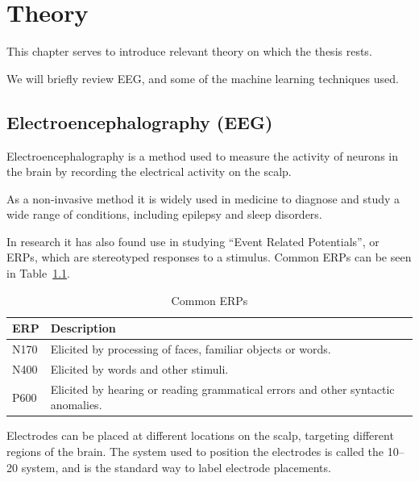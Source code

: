 \chapter{Theory}

This chapter serves to introduce relevant theory on which the thesis rests. 

We will briefly review EEG, and some of the machine learning techniques used.

\section{Electroencephalography (EEG)}\label{eeg-theory}

    Electroencephalography is a method used to measure the activity of neurons in the brain by recording the electrical activity on the scalp.

    As a non-invasive method it is widely used in medicine to diagnose and study a wide range of conditions, including epilepsy and sleep disorders.

    In research it has also found use in studying ``Event Related Potentials'', or ERPs, which are stereotyped responses to a stimulus. Common ERPs can be seen in Table~\ref{table:erps}.

    \begin{table}
        \begin{tabular}{ll}
            \toprule
            ERP & Description
            \\
            \midrule
            N170 & Elicited by processing of faces, familiar objects or words.
            \\
            N400 & Elicited by words and other stimuli.
            \\
            P600 & Elicited by hearing or reading grammatical errors and other syntactic anomalies.
            \\
            \bottomrule
        \end{tabular}
        \caption{Common ERPs}\label{table:erps}
    \end{table}

    Electrodes can be placed at different locations on the scalp, targeting different regions of the brain. The system used to position the electrodes is called the 10–20 system, and is the standard way to label electrode placements.


